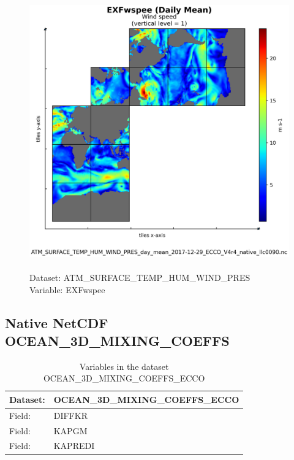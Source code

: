 \begin{figure}[H]
\centering
\includegraphics[scale=0.5]{../images/plots/native_plots/Atmosphere_Surface_Temperature_Humidity_Wind_and_Pressure/EXFwspee.png}
\caption{\\Dataset: ATM\_SURFACE\_TEMP\_HUM\_WIND\_PRES\\Variable: EXFwspee}
\label{tab:table-ATM_SURFACE_TEMP_HUM_WIND_PRES_EXFwspee-Plot}
\end{figure}
\pagebreak
\subsection{Native NetCDF OCEAN\_3D\_MIXING\_COEFFS}
\newp
\begin{longtable}{|p{}|p{}|}
\caption{Variables in the dataset OCEAN\_3D\_MIXING\_COEFFS\_ECCO}
\label{tab:table-OCEAN_3D_MIXING_COEFFS_ECCO-fields} \\ 
\hline \endhead \hline \endfoot
\rowcolor{lightgray} \textbf{Dataset:} & \textbf{OCEAN\_3D\_MIXING\_COEFFS\_ECCO} \\ \hline
Field: &DIFFKR \\ \hline
Field: &KAPGM \\ \hline
Field: &KAPREDI \\ \hline
\end{longtable}

\pagebreak
